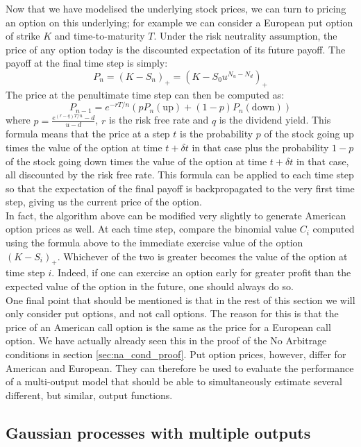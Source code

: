 \documentclass[a4paper,12pt]{article}
\begin{document}
\noindent Now that we have modelised the underlying stock prices, we can turn to pricing an option on this underlying; for example we can consider a European put option of strike $K$ and time-to-maturity $T$. Under the risk neutrality assumption, the price of any option today is the discounted expectation of its future payoff. The payoff at the final time step is simply:
$$P_n = (K-S_n)_{+} = (K-S_0 u^{N_u - N_d})_{+}$$
The price at the penultimate time step can then be computed as:
$$P_{n-1} = e^{-r T/n} \left(p P_n(\text{up}) + (1-p) P_n(\text{down}) \right)$$
where $p = \frac{e^{(r-q)T/n} - d}{u - d}$, $r$ is the risk free rate and $q$ is the dividend yield. This formula means that the price at a step $t$ is the probability $p$ of the stock going up times the value of the option at time $t+\delta t$ in that case plus the probability $1-p$ of the stock going down times the value of the option at time $t+\delta t$ in that case, all discounted by the risk free rate. This formula can be applied to each time step so that the expectation of the final payoff is backpropagated to the very first time step, giving us the current price of the option.\\
In fact, the algorithm above can be modified very slightly to generate American option prices as well. At each time step, compare the binomial value $C_i$ computed using the formula above to the immediate exercise value of the option $(K-S_i)_{+}$. Whichever of the two is greater becomes the value of the option at time step $i$. Indeed, if one can exercise an option early for greater profit than the expected value of the option in the future, one should always do so.\\
One final point that should be mentioned is that in the rest of this section we will only consider put options, and not call options. The reason for this is that the price of an American call option is the same as the price for a European call option. We have actually already seen this in the proof of the No Arbitrage conditions in section \ref{sec:na_cond_proof}. Put option prices, however, differ for American and European. They can therefore be used to evaluate the performance of a multi-output model that should be able to simultaneously estimate several different, but similar, output functions.

\subsection{Gaussian processes with multiple outputs}
\end{document}
